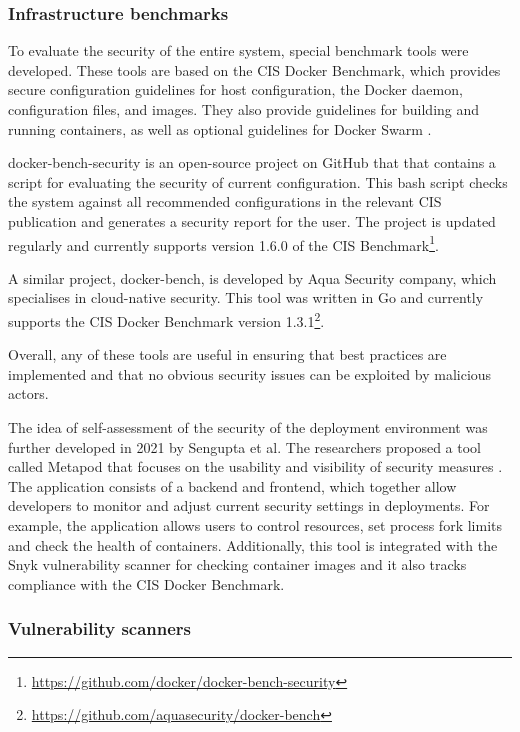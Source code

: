 \subsubsection*{Infrastructure benchmarks}

To evaluate the security of the entire system, special benchmark tools were developed. These tools are based on the CIS Docker Benchmark, which provides secure configuration guidelines for host configuration, the Docker daemon, configuration files, and images. They also provide guidelines for building and running containers, as well as optional guidelines for Docker Swarm \cite{cis:docker}.

docker-bench-security is an open-source project on GitHub that that contains a script for evaluating the security of current configuration. This bash script checks the system against all recommended configurations in the relevant CIS publication and generates a security report for the user. The project is updated regularly and currently supports version 1.6.0 of the CIS Benchmark\footnote{\url{https://github.com/docker/docker-bench-security}}.

A similar project, docker-bench, is developed by Aqua Security company, which specialises in cloud-native security. This tool was written in Go and currently supports the CIS Docker Benchmark version 1.3.1\footnote{\url{https://github.com/aquasecurity/docker-bench}}.

Overall, any of these tools are useful in ensuring that best practices are implemented and that no obvious security issues can be exploited by malicious actors.

The idea of self-assessment of the security of the deployment environment was further developed in 2021 by Sengupta et al. The researchers proposed a tool called Metapod that focuses on the usability and visibility of security measures \cite{c:14}. The application consists of a backend and frontend, which together allow developers to monitor and adjust current security settings in deployments. For example, the application allows users to control resources, set process fork limits and check the health of containers. Additionally, this tool is integrated with the Snyk vulnerability scanner for checking container images and it also tracks compliance with the CIS Docker Benchmark.

\subsubsection*{Vulnerability scanners}

